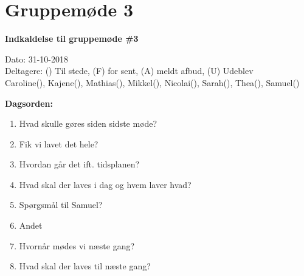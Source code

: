 \section{Gruppemøde 3}

\vspace{0.5 cm}
\textbf{Indkaldelse til gruppemøde \#3}

Dato: 31-10-2018 \\
Deltagere: () Til stede, (F) for sent, (A) meldt afbud, (U) Udeblev \\
Caroline(), Kajene(), Mathias(), Mikkel(), Nicolai(), Sarah(), Thea(), Samuel() 

\vspace{0.1 cm}
\textbf{Dagsorden:}

\begin{enumerate}
	\item Hvad skulle gøres siden sidste møde?
	\item Fik vi lavet det hele?
	\item Hvordan går det ift. tidsplanen?
	\item Hvad skal der laves i dag og hvem laver hvad?
	\item Spørgsmål til Samuel?
	\item Andet
	\item Hvornår mødes vi næste gang?
	\item Hvad skal der laves til næste gang?
\end{enumerate}

